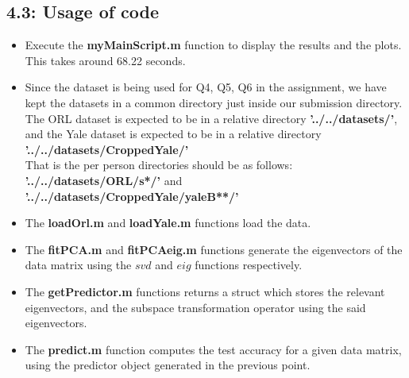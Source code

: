 \documentclass[12pt, a4paper]{article}
\begin{document}
\subsection*{4.3: Usage of code}
\begin{itemize}
\item Execute the \textbf{myMainScript.m} function to display the results and the plots. This takes around 68.22 seconds.
\item Since the dataset is being used for Q4, Q5, Q6 in the assignment, we have kept the datasets in a common directory just inside our submission directory. The ORL dataset is expected to be in a relative directory \textbf{'../../datasets/'}, and the Yale dataset is expected to be in a relative directory \textbf{'../../datasets/CroppedYale/'} \\ 
That is the per person directories should be as follows: \\\textbf{'../../datasets/ORL/s*/'} and \\\textbf{'../../datasets/CroppedYale/yaleB**/'}
\item The \textbf{loadOrl.m} and \textbf{loadYale.m} functions load the data.
\item The \textbf{fitPCA.m} and \textbf{fitPCAeig.m} functions generate the eigenvectors of the data matrix using the $svd$ and $eig$ functions respectively.
\item The \textbf{getPredictor.m} functions returns a struct which stores the relevant eigenvectors, and the subspace transformation operator using the said eigenvectors.
\item The \textbf{predict.m} function computes the test accuracy for a given data matrix, using the predictor object generated in the previous point.
\end{itemize}
\end{document}
